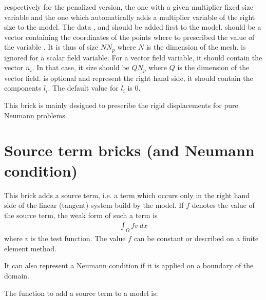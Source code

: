 \documentclass[a4paper,11pt,english]{sphinxmanual}
\begin{document}
respectively for the penalized version, the one with a given multiplier fixed size variable and the one which automatically adds a multiplier variable of the right size to the model. The data ,  and  should be added first to the model.  should be a vector containing the coordinates of the points where to prescribed the value of the variable . It is thus of size \(N N_p\) where \(N\) is the dimension of the mesh.  is ignored for a scalar field variable. For a vector field variable, it should contain the vector \(n_i\). In that case, it size should be \(Q N_p\) where \(Q\) is the dimension of the vector field.  is optional and represent the right hand side, it should contain the components \(l_i\). The default value for \(l_i\) is 0.

This brick is mainly designed to prescribe the rigid displacements for pure Neumann problems.

\ignorespaces 

\section{Source term bricks (and Neumann condition)}
\label{\detokenize{userdoc/model_source_term:source-term-bricks-and-neumann-condition}}\label{\detokenize{userdoc/model_source_term:ud-model-source-term}}\label{\detokenize{userdoc/model_source_term:index-0}}\label{\detokenize{userdoc/model_source_term::doc}}
This brick adds a source term, i.e. a term which occurs only in the right hand side
of the linear (tangent) system build by the model. If \(f\) denotes the value
of the source term, the weak form of such a term is
\begin{equation*}
\begin{split}\int_{\Omega} f v\ dx\end{split}
\end{equation*}
where \(v\) is the test function. The value \(f\) can be constant or
described on a finite element method.

It can also represent a Neumann condition if it is applied on a boundary of the
domain.

The function to add a source term to a model is:

\begin{sphinxVerbatim}[commandchars=\\\{\}]
 
                          
                        
\end{sphinxVerbatim}
\end{document}

